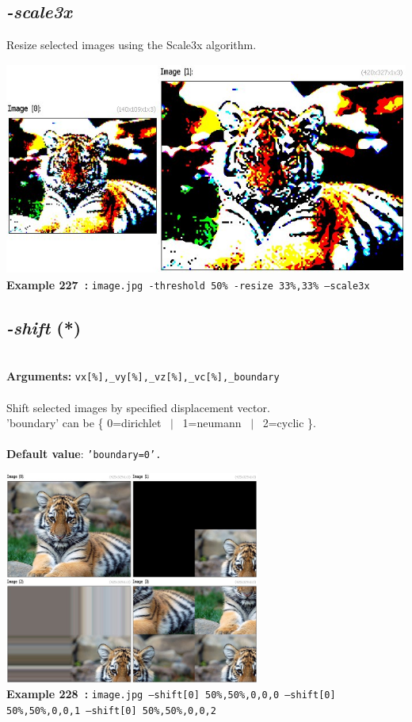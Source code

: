 \documentclass[a4paper,11pt,twoside]{book}
\begin{document}
\subsection{\emph{-scale3x} }\vspace*{-0.5em}
Resize selected images using the Scale3x algorithm.
\begin{center}\includegraphics[keepaspectratio=true,height=7cm,width=\textwidth]{img/gmic_def227.jpg}\\
{\footnotesize \textbf{Example 227~:} \texttt{image.jpg -threshold 50\% -resize 33\%,33\% --scale3x}}
\end{center}

\subsection{\emph{-shift} (*)}\vspace*{-0.5em}
~\\\textbf{Arguments: } 
{\small \texttt{vx[\%],\_vy[\%],\_vz[\%],\_vc[\%],\_boundary}}\\~\\
Shift selected images by specified displacement vector.
~\\'boundary' can be \{ 0=dirichlet ~$|$~ 1=neumann ~$|$~ 2=cyclic \}.
~\\~\\\textbf{Default value}: {\small \texttt{'boundary=0'.}}
\begin{center}\includegraphics[keepaspectratio=true,height=7cm,width=\textwidth]{img/gmic_def228.jpg}\\
{\footnotesize \textbf{Example 228~:} \texttt{image.jpg --shift[0] 50\%,50\%,0,0,0 --shift[0] 50\%,50\%,0,0,1 --shift[0] 50\%,50\%,0,0,2}}
\end{center}
\end{document}
